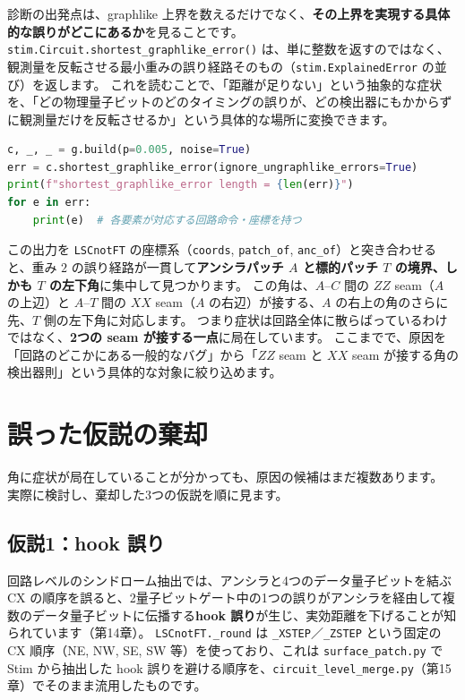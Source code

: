 診断の出発点は、graphlike 上界を数えるだけでなく、\textbf{その上界を実現する具体的な誤りがどこにあるか}を見ることです。
\texttt{stim.Circuit.shortest\_graphlike\_error()} は、単に整数を返すのではなく、観測量を反転させる最小重みの誤り経路そのもの（\texttt{stim.ExplainedError} の並び）を返します。
これを読むことで、「距離が足りない」という抽象的な症状を、「どの物理量子ビットのどのタイミングの誤りが、どの検出器にもかからずに観測量だけを反転させるか」という具体的な場所に変換できます。

\begin{lstlisting}[language=Python, caption={距離を実現する誤り経路を直接見る（src/stages/02\_circuit\_level/src/ftqc/ls\_cnot\_ft.py の demo() 相当）}]
c, _, _ = g.build(p=0.005, noise=True)
err = c.shortest_graphlike_error(ignore_ungraphlike_errors=True)
print(f"shortest_graphlike_error length = {len(err)}")
for e in err:
    print(e)  # 各要素が対応する回路命令・座標を持つ
\end{lstlisting}

この出力を \texttt{LSCnotFT} の座標系（\texttt{coords}, \texttt{patch\_of}, \texttt{anc\_of}）と突き合わせると、重み $2$ の誤り経路が一貫して\textbf{アンシラパッチ $A$ と標的パッチ $T$ の境界、しかも $T$ の左下角}に集中して見つかります。
この角は、$A$–$C$ 間の $ZZ$ seam（$A$ の上辺）と $A$–$T$ 間の $XX$ seam（$A$ の右辺）が接する、$A$ の右上の角のさらに先、$T$ 側の左下角に対応します。
つまり症状は回路全体に散らばっているわけではなく、\textbf{2つの seam が接する一点}に局在しています。
ここまでで、原因を「回路のどこかにある一般的なバグ」から「$ZZ$ seam と $XX$ seam が接する角の検出器則」という具体的な対象に絞り込めます。

\section{誤った仮説の棄却}\label{sec:rejected}

角に症状が局在していることが分かっても、原因の候補はまだ複数あります。
実際に検討し、棄却した3つの仮説を順に見ます。

\subsection{仮説1：hook 誤り}

回路レベルのシンドローム抽出では、アンシラと4つのデータ量子ビットを結ぶ CX の順序を誤ると、2量子ビットゲート中の1つの誤りがアンシラを経由して複数のデータ量子ビットに伝播する\textbf{hook 誤り}が生じ、実効距離を下げることが知られています（第14章）。
\texttt{LSCnotFT.\_round} は \texttt{\_XSTEP}／\texttt{\_ZSTEP} という固定の CX 順序（NE, NW, SE, SW 等）を使っており、これは \texttt{surface\_patch.py} で Stim から抽出した hook 誤りを避ける順序を、\texttt{circuit\_level\_merge.py}（第15章）でそのまま流用したものです。

